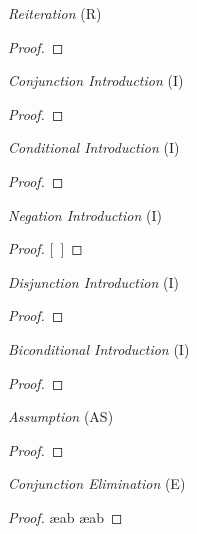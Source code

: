 \documentclass[a4paper, 11pt]{article} %
\begin{document}
\vspace{-.25in}
\begin{multicols}{2}\footnotesize

	\textit{Reiteration} (R)
	\begin{proof}
		 
	\end{proof}
	\medskip

	\textit{Conjunction Introduction} (\eand I)
	\begin{proof}
		 
		 
	\end{proof}
	\medskip

	\textit{Conditional Introduction} (\eif I)
	\begin{proof}
		\open
		\close
	\end{proof}
	\medskip

	\textit{Negation Introduction} (\enot I)
	\begin{proof}
		\open
		\metaA {}   %
		\metaB
		\close
		[\ ]{\enot\metaA}
	\end{proof}
	\medskip

	\textit{Disjunction Introduction} (\eor I)
	\begin{proof}
	\end{proof}
	\medskip

	\textit{Biconditional Introduction} (\eiff I)
	\begin{proof}
		\open
		 
		\close
		\open
		 
		\close
	\end{proof}
	\medskip

	\vfill
	\strut
	\columnbreak

	\textit{Assumption} (AS)
	\begin{proof}
		\open
		 \as{}{}
	\end{proof}
	\medskip

	\textit{Conjunction Elimination} (\eand E)
	\begin{proof}
		 \ae{ab}
		 \ae{ab}
	\end{proof}
	\medskip


\end{multicols}
\end{document}

